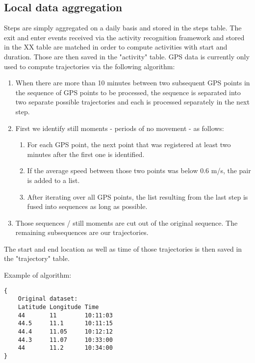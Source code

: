 \subsection{Local data aggregation}
Steps are simply aggregated on a daily basis and stored in the steps table. The exit and enter events received via the activity recognition framework and stored in the XX table are matched in order to compute activities with start and duration. Those are then saved in the "activity" table.
GPS data is currently only used to compute trajectories via the following algorithm:
\begin{enumerate}
	\item When there are more than 10 minutes between two subsequent GPS points in the sequence of GPS points to be processed, the sequence is separated into two separate possible trajectories and each is processed separately in the next step.
	\item First we identify still moments - periods of no movement - as follows:
	\begin{enumerate}
		\item For each GPS point, the next point that was registered at least two minutes after the first one is identified.
		\item If the average speed between those two points was below 0.6 m/s, the pair is added to a list.
		\item After iterating over all GPS points, the list resulting from the last step is fused into sequences as long as possible.
	\end{enumerate}
	\item Those sequences / still moments are cut out of the original sequence. The remaining subsequences are our trajectories.
\end{enumerate}
The start and end location as well as time of those trajectories is then saved in the "trajectory" table.

Example of algorithm:
\begin{verbatim}
{
	Original dataset:			
	Latitude Longitude Time
	44		 11		   10:11:03
	44.5	 11.1	   10:11:15
	44.4	 11.05	   10:12:12
	44.3	 11.07	   10:33:00
	44	     11.2	   10:34:00
}
\end{verbatim}

